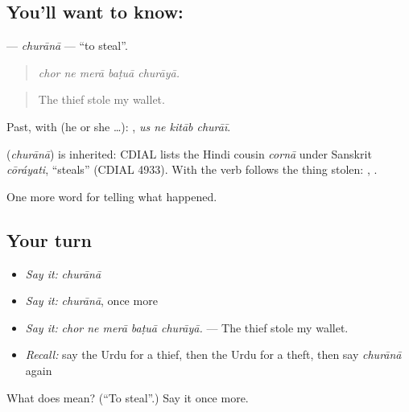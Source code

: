 \subsection*{You'll want to know: }
\textbf{} — \emph{churānā} — \textquotedblleft{}to steal\textquotedblright{}.

\begin{quote}
    
\end{quote}

\begin{quote}
\emph{chor ne merā baṭuā churāyā.}
\end{quote}

\begin{quote}
The thief stole my wallet.
\end{quote}

Past, with  (he or she …):    , \emph{us ne kitāb churāī}.

\begin{cousinweb}
\textbf{} (\emph{churānā}) is inherited: CDIAL lists the Hindi cousin \emph{cornā} under Sanskrit \emph{cōráyati}, \textquotedblleft{}steals\textquotedblright{} (CDIAL 4933). With \textbf{} the verb follows the thing stolen: \textbf{ }, \textbf{ }.
\end{cousinweb}

\begin{grammarlens}[title={What you've built}]
One more word for telling what happened.
\end{grammarlens}

\subsection*{Your turn}
\begin{itemize}
\raggedright
  \item \emph{Say it:} \emph{churānā}
  \item \emph{Say it:} \emph{churānā}, once more
  \item \emph{Say it:} \emph{chor ne merā baṭuā churāyā.} — The thief stole my wallet.
  \item \emph{Recall:} say the Urdu for a thief, then the Urdu for a theft, then say \emph{churānā} again
\end{itemize}

\begin{tcolorbox}[breakable,colback=teal!4,colframe=teal!35!black,title={Before you move on}]
What does  mean? (\textquotedblleft{}To steal\textquotedblright{}.) Say it once more.
\end{tcolorbox}
